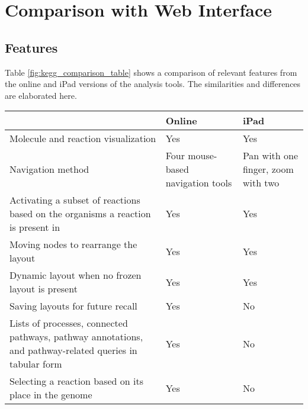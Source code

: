 \section{Comparison with \pathcasekegg Web Interface}
\label{sect:kegg_comparison}

\subsection{Features}
\label{sect:kegg_comparison_features}

Table \ref{fig:kegg_comparison_table} shows a comparison of relevant features
from the online and iPad versions of the \pathcasekegg analysis tools. The
similarities and differences are elaborated here.

\begin{table}[ht!]
\centering
\begin{tabular}{ | p{2.75in} | p{1.25in} | p{1.25in} | }
    \hline
                        & Online    & iPad \\ \hline

    Molecule and reaction visualization
                        & Yes       & Yes \\ \hline

    Navigation method   & Four mouse-based navigation tools
                                    & Pan with one finger, zoom with two
                                    \\ \hline

    Activating a subset of reactions based on the organisms a reaction is
    present in
                        & Yes       & Yes \\ \hline

    Moving nodes to rearrange the layout
                        & Yes       & Yes \\ \hline

    Dynamic layout when no frozen layout is present
                        & Yes       & Yes \\ \hline

    Saving layouts for future recall
                        & Yes       & No \\ \hline

    Lists of processes, connected pathways, pathway annotations, and
    pathway-related queries in tabular form
                        & Yes       & No \\ \hline

    Selecting a reaction based on its place in the genome
                        & Yes       & No \\ \hline


\end{tabular}
\end{table}
